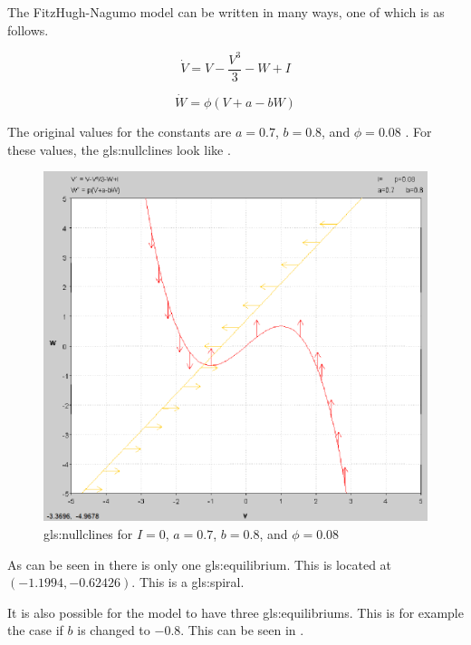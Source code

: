 \documentclass[../Orator]{subfiles}
\begin{document}
The FitzHugh-Nagumo model can be written in many ways, one of which is as follows.

\begin{equation}
    \dot{V}=V-\frac{V^{3}}{3}-W+I
\end{equation}

\begin{equation}
    \dot{W}=\phi (V+a-bW)
\end{equation}

The original values for the constants are \(a=0.7\), \(b=0.8\), and \(\phi=0.08\) \cite{}. For these values, the \glspl{gls:nullcline} look like . 

\begin{figure}[h]
    \centering
    \includegraphics[width=400pt]{Pictures/Alex/Nullclines - original.PNG}
    \caption{\Gls{gls:nullcline}s for \(I=0\), \(a=0.7\), \(b=0.8\), and \(\phi=0.08\)}
    \label{fig:nullclines-original}
\end{figure}

As can be seen in  there is only one \gls{gls:equilibrium}. This is located at \((-1.1994, -0.62426)\). This is a \gls{gls:spiral}. 

It is also possible for the model to have three \glspl{gls:equilibrium}. This is for example the case if \(b\) is changed to \(-0.8\). This can be seen in .
\end{document}
